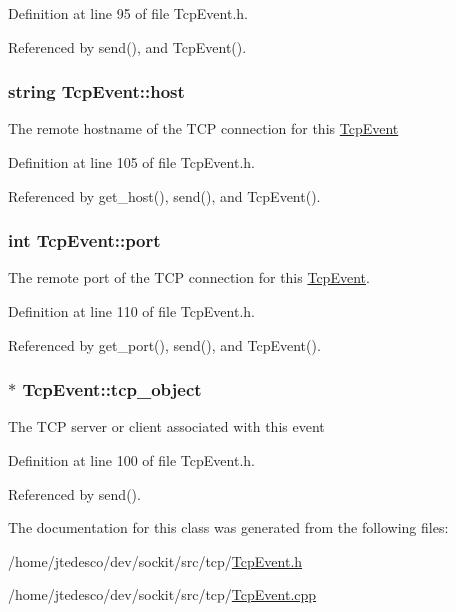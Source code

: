 Definition at line 95 of file TcpEvent.h.



Referenced by send(), and TcpEvent().

\hypertarget{classTcpEvent_a64ff43fff8e7488f4c4c7bccebbf2d0d}{
\subsubsection[{host}]{\setlength{\rightskip}{0pt plus 5cm}string {\bf TcpEvent::host}}}
\label{classTcpEvent_a64ff43fff8e7488f4c4c7bccebbf2d0d}
The remote hostname of the TCP connection for this {\ttfamily \hyperlink{classTcpEvent}{TcpEvent}} 

Definition at line 105 of file TcpEvent.h.



Referenced by get\_\-host(), send(), and TcpEvent().

\hypertarget{classTcpEvent_a32b592e6367f3a43a6a66884d94c3d9c}{
\subsubsection[{port}]{\setlength{\rightskip}{0pt plus 5cm}int {\bf TcpEvent::port}}}
\label{classTcpEvent_a32b592e6367f3a43a6a66884d94c3d9c}
The remote port of the TCP connection for this {\ttfamily \hyperlink{classTcpEvent}{TcpEvent}}. 

Definition at line 110 of file TcpEvent.h.



Referenced by get\_\-port(), send(), and TcpEvent().

\hypertarget{classTcpEvent_ade4fbb5b8a07ec56098fb3301f5ac7a1}{
\subsubsection[{tcp\_\-object}]{$\ast$ {\bf TcpEvent::tcp\_\-object}}}
\label{classTcpEvent_ade4fbb5b8a07ec56098fb3301f5ac7a1}
The TCP server or client associated with this event 

Definition at line 100 of file TcpEvent.h.



Referenced by send().



The documentation for this class was generated from the following files:\begin{DoxyCompactItemize}
\item 
/home/jtedesco/dev/sockit/src/tcp/\hyperlink{TcpEvent_8h}{TcpEvent.h}\item 
/home/jtedesco/dev/sockit/src/tcp/\hyperlink{TcpEvent_8cpp}{TcpEvent.cpp}\end{DoxyCompactItemize}
